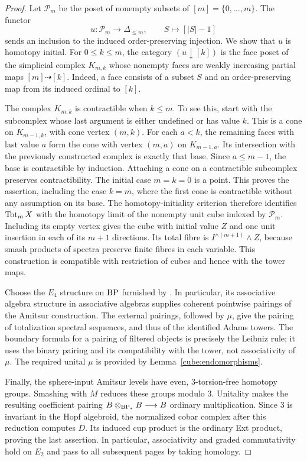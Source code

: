 \begin{proof}
Let $\mathcal P_m$ be the poset of nonempty subsets of
$[m]=\{0,\ldots,m\}$.  The functor
\[
 u\colon\mathcal P_m\longrightarrow\Delta_{\leq m},\qquad
 S\longmapsto[|S|-1]
\]
sends an inclusion to the induced order-preserving injection.  We show
that $u$ is homotopy initial.  For $0\leq k\leq m$, the category
$(u\downarrow[k])$ is the face poset of the simplicial complex
$K_{m,k}$ whose nonempty faces are weakly increasing partial maps
$[m]\dashrightarrow[k]$.  Indeed, a face consists of a subset $S$ and
an order-preserving map from its induced ordinal to $[k]$.

The complex $K_{m,k}$ is contractible when $k\leq m$.  To see this,
start with the subcomplex whose last argument is either undefined or
has value $k$.  This is a cone on $K_{m-1,k}$, with cone vertex $(m,k)$.
For each $a<k$, the remaining faces with last value $a$ form the cone
with vertex $(m,a)$ on $K_{m-1,a}$.  Its intersection with the previously
constructed complex is exactly that base.  Since $a\leq m-1$, the base
is contractible by induction.  Attaching a cone on a contractible
subcomplex preserves contractibility.  The initial case $m=k=0$ is a
point.  This proves the assertion, including the case $k=m$, where the
first cone is contractible without any assumption on its base.
The homotopy-initiality criterion therefore identifies $\operatorname{Tot}_m X$ with
the homotopy limit of the nonempty unit cube indexed by $\mathcal P_m$.
Including its empty vertex gives the cube with initial value $Z$ and
one unit insertion in each of its $m+1$ directions.  Its total fibre is
$I^{\wedge(m+1)}\wedge Z$, because smash products of spectra preserve
finite fibres in each variable.  This construction is compatible with
restriction of cubes and hence with the tower maps.

Choose the $E_4$ structure on $\mathrm{BP}$ furnished by
\cite[Theorem~1.1]{BasterraMandell}.  In particular, its associative algebra
structure in associative algebras supplies coherent pointwise pairings
of the Amitsur construction.  The external pairings, followed by
$\mu$, give the pairing of totalization spectral sequences, and thus
of the identified Adams towers.  The boundary formula for a pairing
of filtered objects is precisely the Leibniz rule; it uses the binary
pairing and its compatibility with the tower, not associativity of
$\mu$.  The required unital $\mu$ is provided by
Lemma~\ref{cube:endomorphisms}.

Finally, the sphere-input Amitsur levels have even, $3$-torsion-free
homotopy groups.  Smashing with $M$ reduces these groups modulo $3$.
Unitality makes the resulting coefficient pairing
$B\otimes_{\mathrm{BP}_*}B\longrightarrow B$ ordinary multiplication.
Since $3$ is invariant in the Hopf algebroid, the normalized cobar
complex after this reduction computes $D$.  Its induced cup product
is the ordinary Ext product, proving the last assertion.  In
particular, associativity and graded commutativity hold on $E_2$ and
pass to all subsequent pages by taking homology.
\end{proof}

